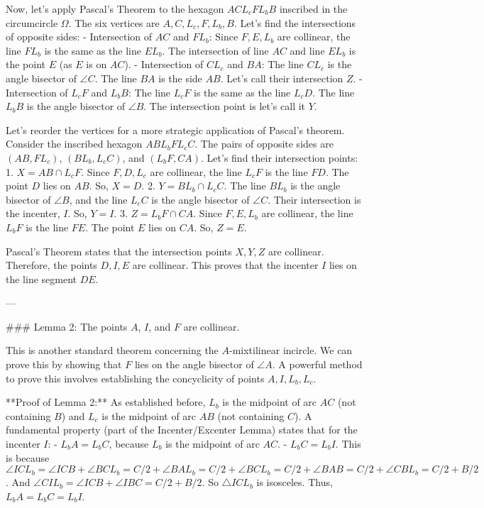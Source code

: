 Now, let's apply Pascal's Theorem to the hexagon $A C L_c F L_b B$ inscribed in the circumcircle $\Omega$. The six vertices are $A, C, L_c, F, L_b, B$. Let's find the intersections of opposite sides:
- Intersection of $AC$ and $FL_b$: Since $F, E, L_b$ are collinear, the line $FL_b$ is the same as the line $EL_b$. The intersection of line $AC$ and line $EL_b$ is the point $E$ (as $E$ is on $AC$).
- Intersection of $CL_c$ and $BA$: The line $CL_c$ is the angle bisector of $\angle C$. The line $BA$ is the side $AB$. Let's call their intersection $Z$.
- Intersection of $L_cF$ and $L_bB$: The line $L_cF$ is the same as the line $L_cD$. The line $L_bB$ is the angle bisector of $\angle B$. The intersection point is let's call it $Y$.

Let's reorder the vertices for a more strategic application of Pascal's theorem. Consider the inscribed hexagon $A B L_b F L_c C$.
The pairs of opposite sides are $(AB, FL_c)$, $(BL_b, L_cC)$, and $(L_bF, CA)$.
Let's find their intersection points:
1.  $X = AB \cap L_cF$. Since $F, D, L_c$ are collinear, the line $L_cF$ is the line $FD$. The point $D$ lies on $AB$. So, $X=D$.
2.  $Y = BL_b \cap L_cC$. The line $BL_b$ is the angle bisector of $\angle B$, and the line $L_cC$ is the angle bisector of $\angle C$. Their intersection is the incenter, $I$. So, $Y=I$.
3.  $Z = L_bF \cap CA$. Since $F, E, L_b$ are collinear, the line $L_bF$ is the line $FE$. The point $E$ lies on $CA$. So, $Z=E$.

Pascal's Theorem states that the intersection points $X, Y, Z$ are collinear. Therefore, the points $D, I, E$ are collinear. This proves that the incenter $I$ lies on the line segment $DE$.

---

### Lemma 2: The points $A$, $I$, and $F$ are collinear.

This is another standard theorem concerning the $A$-mixtilinear incircle. We can prove this by showing that $F$ lies on the angle bisector of $\angle A$. A powerful method to prove this involves establishing the concyclicity of points $A, I, L_b, L_c$.

**Proof of Lemma 2:**
As established before, $L_b$ is the midpoint of arc $AC$ (not containing $B$) and $L_c$ is the midpoint of arc $AB$ (not containing $C$).
A fundamental property (part of the Incenter/Excenter Lemma) states that for the incenter $I$:
- $L_bA = L_bC$, because $L_b$ is the midpoint of arc $AC$.
- $L_bC = L_bI$. This is because $\angle ICL_b = \angle ICB + \angle BCL_b = C/2 + \angle BAL_b = C/2 + \angle BCL_b = C/2 + \angle BAB = C/2 + \angle CBL_b = C/2 + B/2$. And $\angle CIL_b = \angle ICB + \angle IBC = C/2+B/2$. So $\triangle ICL_b$ is isosceles.
Thus, $L_bA = L_bC = L_bI$.

